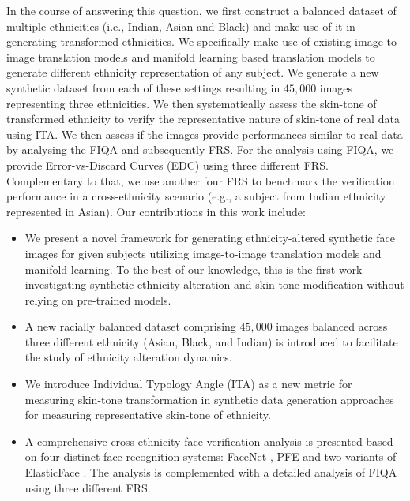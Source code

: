 {In the course of answering this question, we first construct a balanced dataset of multiple ethnicities (i.e., Indian, Asian and Black) and make use of it in generating transformed ethnicities. We specifically make use of existing image-to-image translation models and manifold learning based translation models to generate different ethnicity representation of any subject. We generate a new synthetic dataset from each of these settings resulting in $45,000$ images representing three ethnicities. We then systematically assess the skin-tone of transformed ethnicity to verify the representative nature of skin-tone of real data using ITA. We then assess if the images provide performances similar to real data by analysing the FIQA and subsequently FRS. For the analysis using FIQA, we provide Error-vs-Discard Curves (EDC) using three different FRS. Complementary to that, we use another four FRS to benchmark the verification performance in a cross-ethnicity scenario (e.g., a subject from Indian ethnicity represented in Asian). Our contributions in this work include:
\begin{itemize}[noitemsep]
    \item We present a novel framework for generating ethnicity-altered synthetic face images for given subjects utilizing image-to-image translation models and manifold learning. To the best of our knowledge, this is the first work investigating synthetic ethnicity alteration and skin tone modification without relying on pre-trained models. 
    \item A new racially balanced dataset comprising $45,000$ images balanced across three different ethnicity (Asian, Black, and Indian) is introduced to facilitate the study of ethnicity alteration dynamics. 
    \item  We introduce Individual Typology Angle (ITA) as a new metric for measuring skin-tone transformation in synthetic data generation approaches for measuring representative skin-tone of ethnicity.
    \item A comprehensive cross-ethnicity face verification analysis is presented based on four distinct face recognition systems: FaceNet \cite{FaceNet2015}, PFE \cite{PFE2019} and two variants of ElasticFace 
    \cite{Boutros_2022_CVPR}. The analysis is complemented with a detailed analysis of FIQA using three different FRS. 		
\end{itemize}

}
